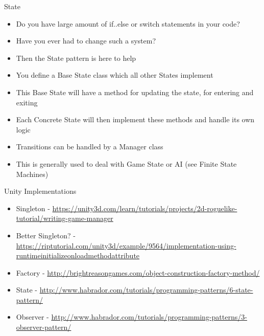 \begin{frame}{State}
	\begin{itemize}
		\item Do you have large amount of if..else or switch statements in your code?
		\item Have you ever had to change such a system?
		\item Then the State pattern is here to help
		\item You define a Base State class which all other States implement
		\item This Base State will have a method for updating the state, for entering and exiting
		\item Each Concrete State will then implement these methods and handle its own logic 
		\item Transitions can be handled by a Manager class
		\item This is generally used to deal with Game State or AI (see Finite State Machines)
	\end{itemize}
\end{frame}

\begin{frame}{Unity Implementations}
	\begin{itemize}
		\item Singleton - \url{https://unity3d.com/learn/tutorials/projects/2d-roguelike-tutorial/writing-game-manager}
		\item Better Singleton? - \url{https://riptutorial.com/unity3d/example/9564/implementation-using-runtimeinitializeonloadmethodattribute}
		\item Factory - \url{http://brightreasongames.com/object-construction-factory-method/}
		\item State - \url{http://www.habrador.com/tutorials/programming-patterns/6-state-pattern/}
		\item Observer -
		\url{http://www.habrador.com/tutorials/programming-patterns/3-observer-pattern/}
		
	\end{itemize}
\end{frame}